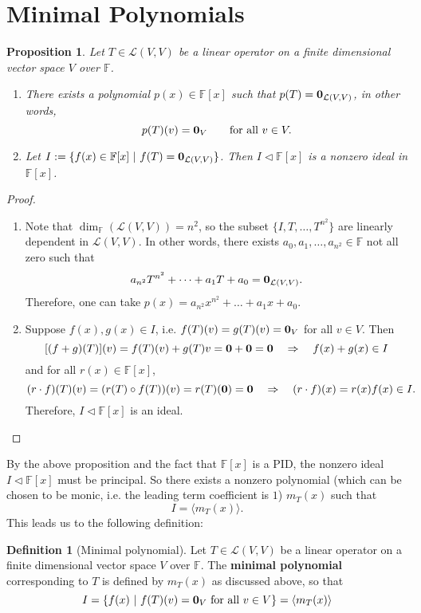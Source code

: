 \documentclass[11pt,openany]{book}
\theoremstyle{plain}
\newtheorem{proposition}[proposition]{Proposition}
\theoremstyle{definition}
\newtheorem{definition}[definition]{Definition}
\theoremstyle{remark}
\begin{document}
\section{Minimal Polynomials}
\begin{proposition} \label{prop-minpoly}
    Let $T \in \mathcal{L}(V,V)$ be a linear operator on a finite dimensional vector space $V$ over $\mathbb{F}$. 
    \begin{enumerate}
    \item There exists a polynomial $p(x) \in \mathbb{F}[x]$ such that $p(T) = {\bf 0}_{\mathcal{L}(V,V)}$, in other words,
    $$p(T)(v) = {\bf 0}_V \quad \quad \text{for all}\ v \in V.$$
    \item Let $I := \{ f(x) \in \mathbb{F}[x]\ |\ f(T) = {\bf 0}_{\mathcal{L}(V,V)}\}$. Then $I \lhd \mathbb{F}[x]$ is a nonzero ideal in $\mathbb{F}[x]$.
    \end{enumerate}
\end{proposition}
\begin{proof}
    \begin{enumerate}
        \item Note that $\dim_{\mathbb{F}}(\mathcal{L}(V,V)) = n^2$, so the subset $\{I, T, \dots, T^{n^2}\}$ are linearly dependent in $\mathcal{L}(V,V)$. In other words, there exists $a_0, a_1, \dots, a_{n^2} \in \mathbb{F}$ not all zero such that
        $$a_{n^2} T^{n^2} + \dots + a_1 T + a_0 = {\bf 0}_{\mathcal{L}(V,V)}.$$
        Therefore, one can take $p(x) = a_{n^2} x^{n^2} + \dots + a_1 x + a_0$.
        \item Suppose $f(x), g(x) \in I$, i.e. $f(T)(v) = g(T)(v) = {\bf 0}_V$ for all $v \in V$. Then
        $$[(f+g)(T)](v) = f(T)(v) + g(T)v = {\bf 0} + {\bf 0} = {\bf 0}  \quad \Rightarrow \quad f(x) + g(x) \in I$$
        and for all $r(x) \in \mathbb{F}[x]$,
        $$(r \cdot f)(T)(v) = (r(T) \circ f(T))(v) = r(T)({\bf 0}) = {\bf 0} \quad \Rightarrow \quad (r\cdot f)(x) = r(x)f(x) \in I.$$
        Therefore, $I \lhd \mathbb{F}[x]$ is an ideal.
    \end{enumerate}
\end{proof}

By the above proposition and the fact that $\mathbb{F}[x]$ is a PID, the nonzero ideal $I \lhd \mathbb{F}[x]$ must be principal. So there exists a nonzero polynomial (which can be chosen to be monic, i.e. the leading term coefficient is $1$) $m_T(x)$ such that
$$I = \langle m_T(x) \rangle.$$
This leads us to the following definition:
\begin{definition}[Minimal polynomial]
    Let $T \in \mathcal{L}(V,V)$ be a linear operator on a finite dimensional vector space $V$ over $\mathbb{F}$. The {\bf minimal polynomial} corresponding to $T$ is defined by $m_T(x)$ as discussed above, so that
    $$I = \{f(x)\ |\ f(T)(v) = {\bf 0}_{V}\ \text{for all } v \in V\} = \langle m_T(x) \rangle$$
\end{definition}
\end{document}
